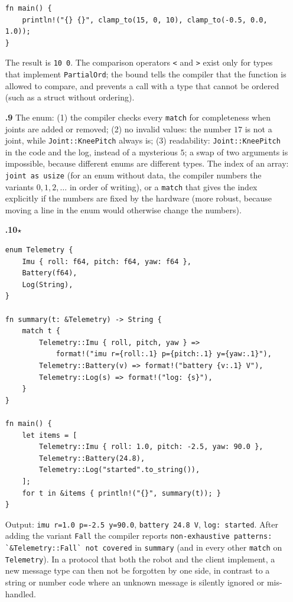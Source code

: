 \begin{enumerate}[label=\textbf{\ansnum.\arabic*}]
\begin{verbatim}
fn main() {
    println!("{} {}", clamp_to(15, 0, 10), clamp_to(-0.5, 0.0, 1.0));
}
\end{verbatim}
The result is \verb!10 0!. The comparison operators \verb!<! and \verb!>! exist only for types that implement \verb!PartialOrd!; the bound tells the compiler that the function is allowed to compare, and prevents a call with a type that cannot be ordered (such as a struct without ordering).
  \item[\textbf{\ansnum.9}] The enum: (1) the compiler checks every \verb!match! for completeness when joints are added or removed; (2) no invalid values: the number $17$ is not a joint, while \verb!Joint::KneePitch! always is; (3) readability: \verb!Joint::KneePitch! in the code and the log, instead of a mysterious $5$; a swap of two arguments is impossible, because different enums are different types. The index of an array: \verb!joint as usize! (for an enum without data, the compiler numbers the variants $0,1,2,\dots$ in order of writing), or a \verb!match! that gives the index explicitly if the numbers are fixed by the hardware (more robust, because moving a line in the enum would otherwise change the numbers).
  \item[\textbf{\ansnum.10}$\star$]
\begin{verbatim}
enum Telemetry {
    Imu { roll: f64, pitch: f64, yaw: f64 },
    Battery(f64),
    Log(String),
}

fn summary(t: &Telemetry) -> String {
    match t {
        Telemetry::Imu { roll, pitch, yaw } =>
            format!("imu r={roll:.1} p={pitch:.1} y={yaw:.1}"),
        Telemetry::Battery(v) => format!("battery {v:.1} V"),
        Telemetry::Log(s) => format!("log: {s}"),
    }
}

fn main() {
    let items = [
        Telemetry::Imu { roll: 1.0, pitch: -2.5, yaw: 90.0 },
        Telemetry::Battery(24.8),
        Telemetry::Log("started".to_string()),
    ];
    for t in &items { println!("{}", summary(t)); }
}
\end{verbatim}
Output: \verb!imu r=1.0 p=-2.5 y=90.0!, \verb!battery 24.8 V!, \verb!log: started!. After adding the variant \verb!Fall! the compiler reports \verb!non-exhaustive patterns: `&Telemetry::Fall` not covered! in \verb!summary! (and in every other \verb!match! on \verb!Telemetry!). In a protocol that both the robot and the client implement, a new message type can then not be forgotten by one side, in contrast to a string or number code where an unknown message is silently ignored or mis-handled.
\end{enumerate}
